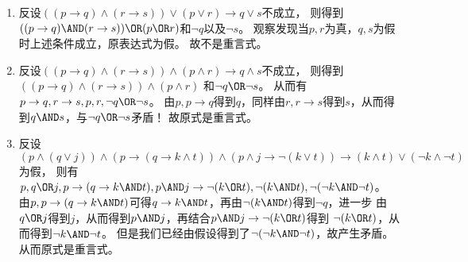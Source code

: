 \documentclass{ctexart}
\begin{document}
\begin{solution}
  \begin{enumerate}
    \item 反设\(((p \to q) \wedge(r \to s)) \vee(p \vee r) \to q \vee s\)不成立，
      则得到\(((p \to q)\AND (r \to s))\OR(p \OR r)\)和\(\neg q\)以及\(\neg s\)。
      观察发现当\(p,r\)为真，\(q,s\)为假时上述条件成立，原表达式为假。
      故不是重言式。
    \item 反设\(((p \to q) \wedge(r \to s)) \wedge(p \wedge r) \to q \wedge s\)不成立，
      则得到\(((p \to q) \wedge(r \to s)) \wedge(p \wedge r) \) 和\(\neg q \OR \neg s\)。
      从而有\(p \to q,r \to s,p,r,\neg q \OR \neg s\)。
      由\(p,p \to q\)得到\(q\)，同样由\(r,r \to s\)得到\(s\)，从而得到\(q \AND s\)，与\(\neg q \OR \neg s\)矛盾！
      故原式是重言式。
    \item 反设\((p \wedge(q \vee j)) \wedge(p \to(q \to k \wedge t)) \wedge(p \wedge j \to \neg(k \vee t)) \to(k \wedge t) \vee(\neg k \wedge \neg t)\) 为假，
      则有\(p,q \OR j,p \to (q \to k \AND t),p \AND j \to \neg (k \OR t),\neg(k \AND t),\neg(\neg k \AND \neg t)\)。
      由\(p,p \to (q \to k \AND t)\)可得\(q \to k \AND t\)，再由\(\neg(k \AND t)\)得到\(\neg q\)，进一步
      由\(q \OR j\)得到\(j\)，从而得到\(p \AND j\)，再结合\(p \AND j \to \neg(k \OR t)\)得到
      \(\neg (k \OR t)\)，从而得到\(\neg k \AND \neg t\)。
      但是我们已经由假设得到了\(\neg(\neg k \AND \neg t)\)，故产生矛盾。
      从而原式是重言式。
  \end{enumerate}
\end{solution}
\end{document}
